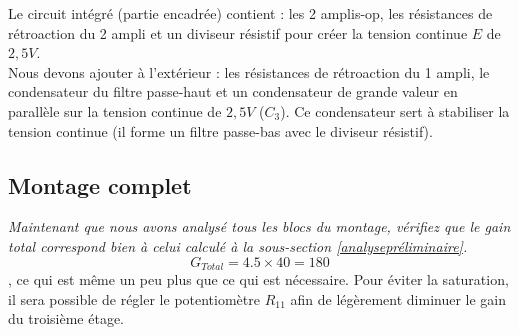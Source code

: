 Le circuit intégré (partie encadrée) contient : les 2 amplis-op, les résistances de rétroaction du 2 ampli et un diviseur résistif pour créer la tension continue $E$ de $2,5V$.\\
Nous devons ajouter à l'extérieur : les résistances de rétroaction du 1 ampli, le condensateur du filtre passe-haut et un condensateur de grande valeur en parallèle sur la tension continue de $2,5V$ ($C_3$). Ce condensateur sert à stabiliser la tension continue (il forme un filtre passe-bas avec le diviseur résistif).


\subsection{Montage complet}
{
\textit{Maintenant que nous avons analysé tous les blocs du montage,
vérifiez que le gain total correspond bien à celui calculé à la sous-section \ref{analysepréliminaire}.}
}
{%
$$G_{Total}=4.5\times 40=180$$, ce qui est même un peu plus que ce qui est nécessaire.
Pour éviter la saturation, il sera possible de régler le potentiomètre $R_{11}$ afin de légèrement diminuer le gain du troisième étage.
}


\newpage
